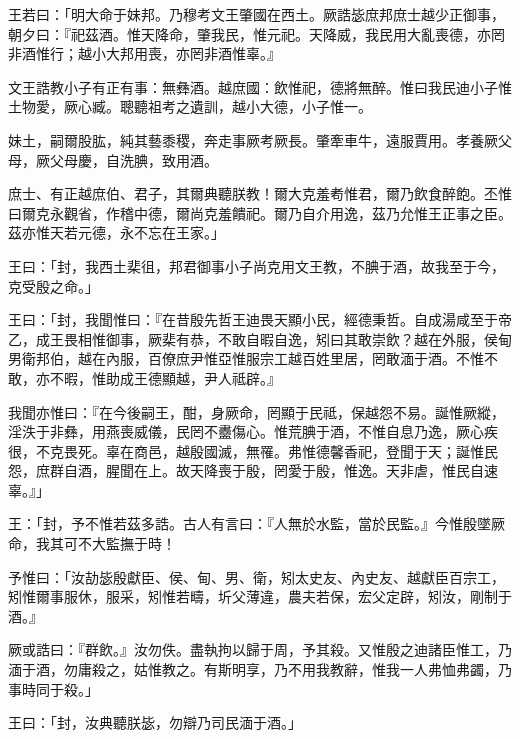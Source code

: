 
\begin{pinyinscope}
王若曰：「明大命于妹邦。乃穆考文王肇國在西土。厥誥毖庶邦庶士越少正御事，朝夕曰：『祀茲酒。惟天降命，肇我民，惟元祀。天降威，我民用大亂喪德，亦罔非酒惟行；越小大邦用喪，亦罔非酒惟辜。』

文王誥教小子有正有事：無彝酒。越庶國：飲惟祀，德將無醉。惟曰我民迪小子惟土物愛，厥心臧。聰聽祖考之遺訓，越小大德，小子惟一。

妹土，嗣爾股肱，純其藝黍稷，奔走事厥考厥長。肇牽車牛，遠服賈用。孝養厥父母，厥父母慶，自洗腆，致用酒。

庶士、有正越庶伯、君子，其爾典聽朕教！爾大克羞耇惟君，爾乃飲食醉飽。丕惟曰爾克永觀省，作稽中德，爾尚克羞饋祀。爾乃自介用逸，茲乃允惟王正事之臣。茲亦惟天若元德，永不忘在王家。」

王曰：「封，我西土棐徂，邦君御事小子尚克用文王教，不腆于酒，故我至于今，克受殷之命。」

王曰：「封，我聞惟曰：『在昔殷先哲王迪畏天顯小民，經德秉哲。自成湯咸至于帝乙，成王畏相惟御事，厥棐有恭，不敢自暇自逸，矧曰其敢崇飲？越在外服，侯甸男衛邦伯，越在內服，百僚庶尹惟亞惟服宗工越百姓里居，罔敢湎于酒。不惟不敢，亦不暇，惟助成王德顯越，尹人祗辟。』

我聞亦惟曰：『在今後嗣王，酣，身厥命，罔顯于民祗，保越怨不易。誕惟厥縱，淫泆于非彝，用燕喪威儀，民罔不衋傷心。惟荒腆于酒，不惟自息乃逸，厥心疾很，不克畏死。辜在商邑，越殷國滅，無罹。弗惟德馨香祀，登聞于天；誕惟民怨，庶群自酒，腥聞在上。故天降喪于殷，罔愛于殷，惟逸。天非虐，惟民自速辜。』」

王：「封，予不惟若茲多誥。古人有言曰：『人無於水監，當於民監。』今惟殷墜厥命，我其可不大監撫于時！

予惟曰：「汝劼毖殷獻臣、侯、甸、男、衛，矧太史友、內史友、越獻臣百宗工，矧惟爾事服休，服采，矧惟若疇，圻父薄違，農夫若保，宏父定辟，矧汝，剛制于酒。』

厥或誥曰：『群飲。』汝勿佚。盡執拘以歸于周，予其殺。又惟殷之迪諸臣惟工，乃湎于酒，勿庸殺之，姑惟教之。有斯明享，乃不用我教辭，惟我一人弗恤弗蠲，乃事時同于殺。」

王曰：「封，汝典聽朕毖，勿辯乃司民湎于酒。」


\end{pinyinscope}